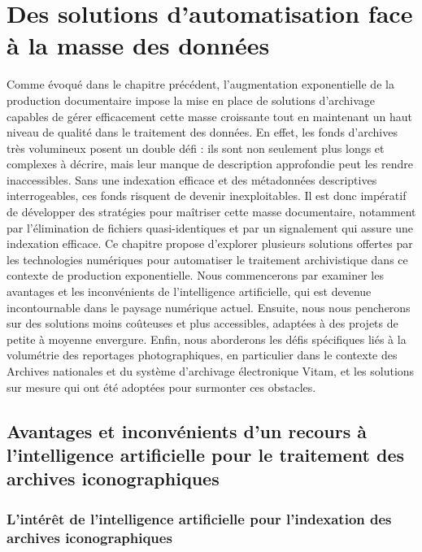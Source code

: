 \chapter{Des solutions d'automatisation face à la masse des données}

Comme évoqué dans le chapitre précédent, l'augmentation exponentielle de la production documentaire impose la mise en place de solutions d'archivage capables de gérer efficacement cette masse croissante tout en maintenant un haut niveau de qualité dans le traitement des données. En effet, les fonds d'archives très volumineux posent un double défi : ils sont non seulement plus longs et complexes à décrire, mais leur manque de description approfondie peut les rendre inaccessibles. Sans une indexation efficace et des métadonnées descriptives interrogeables, ces fonds risquent de devenir inexploitables. Il est donc impératif de développer des stratégies pour maîtriser cette masse documentaire, notamment par l'élimination de fichiers quasi-identiques et par un signalement qui assure une indexation efficace. Ce chapitre propose d'explorer plusieurs solutions offertes par les technologies numériques pour automatiser le traitement archivistique dans ce contexte de production exponentielle. Nous commencerons par examiner les avantages et les inconvénients de l'intelligence artificielle, qui est devenue incontournable dans le paysage numérique actuel. Ensuite, nous nous pencherons sur des solutions moins coûteuses et plus accessibles, adaptées à des projets de petite à moyenne envergure. Enfin, nous aborderons les défis spécifiques liés à la volumétrie des reportages photographiques, en particulier dans le contexte des Archives nationales et du système d'archivage électronique Vitam, et les solutions sur mesure qui ont été adoptées pour surmonter ces obstacles.

\section{Avantages et inconvénients d’un recours à l’intelligence artificielle pour le traitement des archives iconographiques}

\subsection*{L'intérêt de l'intelligence artificielle pour l'indexation des archives iconographiques}

